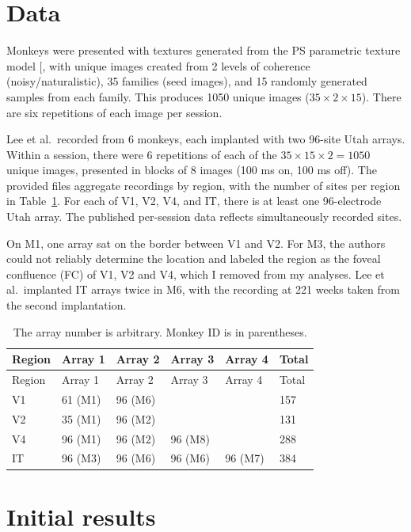 \documentclass[
  11pt,
  letterpaper,
  DIV=11,
  numbers=noendperiod]{scrartcl}
\begin{document}
\section{Data}\label{sec-data}

Monkeys were presented with textures generated from the PS parametric
texture model {[}\citeproc{ref-portilla_parametric_2000}{1}{]}, with
unique images created from 2 levels of coherence (noisy/naturalistic),
35 families (seed images), and 15 randomly generated samples from each
family. This produces 1050 unique images (\(35 \times 2 \times 15\)).
There are six repetitions of each image per session.

Lee et al.~recorded from 6 monkeys, each implanted with two 96-site Utah
arrays. Within a session, there were 6 repetitions of each of the
\(35 \times 15 \times 2 = 1050\) unique images, presented in blocks of 8
images (100 ms on, 100 ms off). The provided files aggregate recordings
by region, with the number of sites per region in Table~\ref{tbl-sites}.
For each of V1, V2, V4, and IT, there is at least one 96-electrode Utah
array. The published per-session data reflects simultaneously recorded
sites.

On M1, one array sat on the border between V1 and V2. For M3, the
authors could not reliably determine the location and labeled the region
as the foveal confluence (FC) of V1, V2 and V4, which I removed from my
analyses. Lee et al.~implanted IT arrays twice in M6, with the recording
at 221 weeks taken from the second implantation.

\begin{longtable}[]{@{}llllll@{}}
\caption{The array number is arbitrary. Monkey ID is in
parentheses.}\label{tbl-sites}\tabularnewline
\toprule\noalign{}
Region & Array 1 & Array 2 & Array 3 & Array 4 & Total \\
\midrule\noalign{}
\endfirsthead
\toprule\noalign{}
Region & Array 1 & Array 2 & Array 3 & Array 4 & Total \\
\midrule\noalign{}
\endhead
\bottomrule\noalign{}
\endlastfoot
V1 & 61 (M1) & 96 (M6) & & & 157 \\
V2 & 35 (M1) & 96 (M2) & & & 131 \\
V4 & 96 (M1) & 96 (M2) & 96 (M8) & & 288 \\
IT & 96 (M3) & 96 (M6) & 96 (M6) & 96 (M7) & 384 \\
\end{longtable}

\section{Initial results}\label{initial-results}
\end{document}
